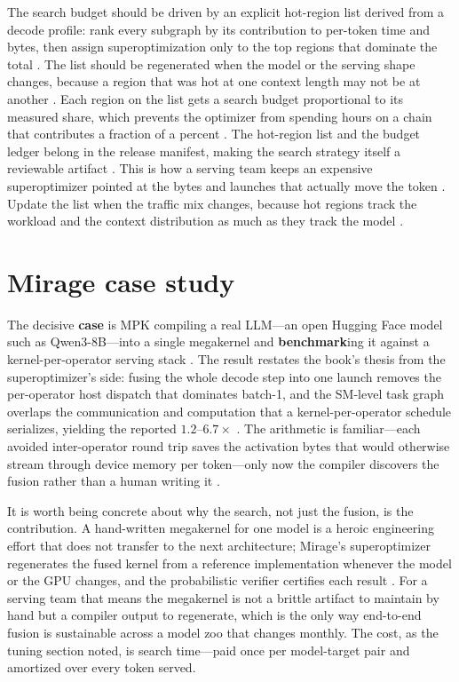 The search budget should be driven by an explicit hot-region list derived from a decode profile: rank every subgraph by its contribution to per-token time and bytes, then assign superoptimization only to the top regions that dominate the total \citep{wu2024mirage,patel2025llminference,memoryfloor2026}. The list should be regenerated when the model or the serving shape changes, because a region that was hot at one context length may not be at another \citep{kwon2023vllm,taxbreak2026}. Each region on the list gets a search budget proportional to its measured share, which prevents the optimizer from spending hours on a chain that contributes a fraction of a percent \citep{wu2024mirage,taxbreak2026}. The hot-region list and the budget ledger belong in the release manifest, making the search strategy itself a reviewable artifact \citep{chen2020compilerbasedhardw,memoryfloor2026}. This is how a serving team keeps an expensive superoptimizer pointed at the bytes and launches that actually move the token \citep{wu2024mirage,patel2025llminference}.
Update the list when the traffic mix changes, because hot regions track the workload and the context distribution as much as they track the model \citep{patel2025llminference,memoryfloor2026}.

\section{Mirage case study}
\label{sec:ch20_mirage_case_study}

The decisive \textbf{case} is MPK compiling a real LLM---an open Hugging Face model such as Qwen3-8B---into a single megakernel and \textbf{benchmark}ing it against a kernel-per-operator serving stack \citep{mpk2025}. The result restates the book's thesis from the superoptimizer's side: fusing the whole decode step into one launch removes the per-operator host dispatch that dominates batch-1, and the SM-level task graph overlaps the communication and computation that a kernel-per-operator schedule serializes, yielding the reported $1.2$--$6.7\times$ \citep{mpk2025,taxbreak2026}. The arithmetic is familiar---each avoided inter-operator round trip saves the activation bytes that would otherwise stream through device memory per token---only now the compiler discovers the fusion rather than a human writing it \citep{memoryfloor2026,dao2022flashattention}.

It is worth being concrete about why the search, not just the fusion, is the contribution. A hand-written megakernel for one model is a heroic engineering effort that does not transfer to the next architecture; Mirage's superoptimizer regenerates the fused kernel from a reference implementation whenever the model or the GPU changes, and the probabilistic verifier certifies each result \citep{wu2024mirage,mpk2025}. For a serving team that means the megakernel is not a brittle artifact to maintain by hand but a compiler output to regenerate, which is the only way end-to-end fusion is sustainable across a model zoo that changes monthly. The cost, as the tuning section noted, is search time---paid once per model-target pair and amortized over every token served.

